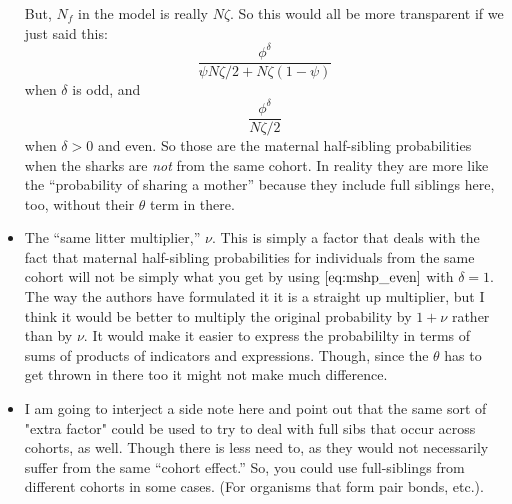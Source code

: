 \documentclass[11pt, oneside]{article}   	%
\begin{document}
\begin{itemize}
But, $N_f$ in the model is really $N\zeta$.  So this would all be more transparent if we just said this:
\begin{equation}
\frac{\phi^\delta}{\psi N\zeta/2 + N\zeta(1-\psi)}
\end{equation}
when $\delta$ is odd, and
\begin{equation}
\frac{\phi^\delta}{N\zeta/2}
\label{eq:mshp_even}
\end{equation}
when $\delta>0$ and even.  So those are the maternal half-sibling probabilities when the sharks are {\em not} from the same
cohort.  In reality they are more like the ``probability of sharing a mother'' because they include full siblings here, too,
without their $\theta$ term in there.
\item The ``same litter multiplier,'' $\nu$.  This is simply a factor that deals with the fact that maternal half-sibling probabilities
for individuals from the same cohort will not be simply what you get by using $\ref{eq:mshp_even}$ with $\delta=1$.
The way the authors have formulated it it is a straight up multiplier, but I think it would be better to multiply the original
probability by $1+\nu$ rather than by $\nu$.  It would make it easier to express the probabililty in terms of sums of products
of indicators and expressions. Though, since the $\theta$ has to get thrown in there too it might not make much difference.
\item I am going to interject a side note here and point out that the same sort of "extra factor" could be used to try to deal with
full sibs that occur across cohorts, as well.  Though there is less need to, as they would not necessarily suffer from the
same ``cohort effect.''  So, you could use full-siblings from different cohorts in some cases. (For organisms that form pair bonds, etc.).
\end{itemize}
\end{document}
